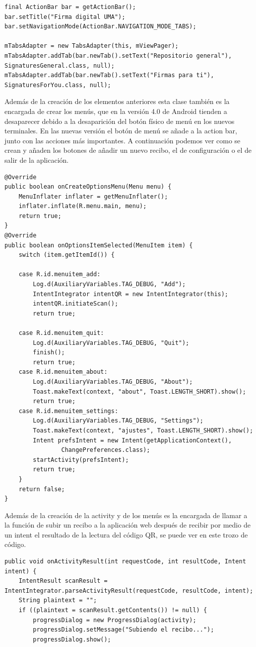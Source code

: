\begin{itemize}
\begin{lstlisting}[style=Java]
final ActionBar bar = getActionBar();
bar.setTitle("Firma digital UMA");
bar.setNavigationMode(ActionBar.NAVIGATION_MODE_TABS);

mTabsAdapter = new TabsAdapter(this, mViewPager);
mTabsAdapter.addTab(bar.newTab().setText("Repositorio general"), SignaturesGeneral.class, null);
mTabsAdapter.addTab(bar.newTab().setText("Firmas para ti"), SignaturesForYou.class, null);
\end{lstlisting}

Además de la creación de los elementos anteriores esta clase también es la encargada de crear los menús, que en la versión 4.0 de Android tienden a desaparecer debido a la desaparición del botón físico de menú en los nuevos terminales. En las nuevas versión el botón de menú se añade a la action bar, junto con las acciones más importantes. A continuación podemos ver como se crean y añaden los botones de añadir un nuevo recibo, el de configuración o el de salir de la aplicación.

\begin{lstlisting}[style=Java]
@Override
public boolean onCreateOptionsMenu(Menu menu) {
	MenuInflater inflater = getMenuInflater();
	inflater.inflate(R.menu.main, menu);
	return true;
}
@Override
public boolean onOptionsItemSelected(MenuItem item) {
	switch (item.getItemId()) {

	case R.id.menuitem_add:
		Log.d(AuxiliaryVariables.TAG_DEBUG, "Add");
		IntentIntegrator intentQR = new IntentIntegrator(this);
		intentQR.initiateScan();
		return true;

	case R.id.menuitem_quit:
		Log.d(AuxiliaryVariables.TAG_DEBUG, "Quit");
		finish();
		return true;
	case R.id.menuitem_about:
		Log.d(AuxiliaryVariables.TAG_DEBUG, "About");
		Toast.makeText(context, "about", Toast.LENGTH_SHORT).show();
		return true;
	case R.id.menuitem_settings:
		Log.d(AuxiliaryVariables.TAG_DEBUG, "Settings");
		Toast.makeText(context, "ajustes", Toast.LENGTH_SHORT).show();
		Intent prefsIntent = new Intent(getApplicationContext(),
		        ChangePreferences.class);
		startActivity(prefsIntent);
		return true;
	}
	return false;
}
\end{lstlisting}

Además de la creación de la activity y de los menús es la encargada de llamar a la función de subir un recibo a la aplicación web después de recibir por medio de un intent el resultado de la lectura del código QR, se puede ver en este trozo de código.

\begin{lstlisting}[style=Java]
public void onActivityResult(int requestCode, int resultCode, Intent intent) {
	IntentResult scanResult = IntentIntegrator.parseActivityResult(requestCode, resultCode, intent);
	String plaintext = "";
	if ((plaintext = scanResult.getContents()) != null) {
		progressDialog = new ProgressDialog(activity);
		progressDialog.setMessage("Subiendo el recibo...");
		progressDialog.show();


\end{lstlisting}
\end{itemize}
